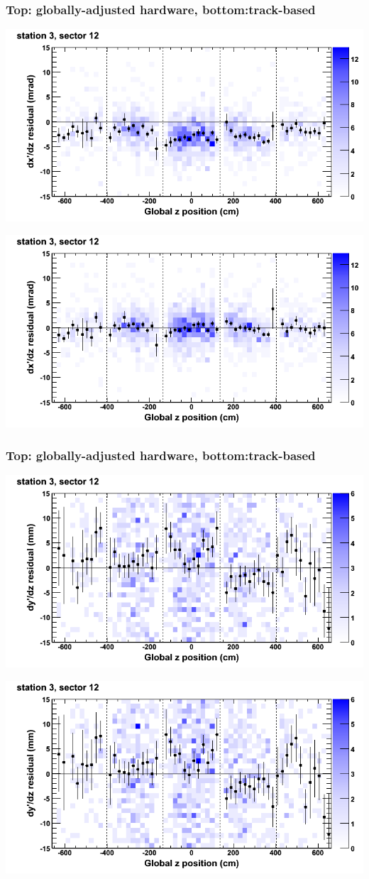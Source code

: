 \documentclass[compress]{beamer}
\begin{document}
\begin{frame}
\frametitle{Top: globally-adjusted hardware, bottom:track-based}
\includegraphics[width=0.7\linewidth]{NOV4_mapplots_HW/DTvsz_st3sec12_dxdz.png}

\includegraphics[width=0.7\linewidth]{NOV4_mapplots/DTvsz_st3sec12_dxdz.png}
\end{frame}

\begin{frame}
\frametitle{Top: globally-adjusted hardware, bottom:track-based}
\includegraphics[width=0.7\linewidth]{NOV4_mapplots_HW/DTvsz_st3sec12_dydz.png}

\includegraphics[width=0.7\linewidth]{NOV4_mapplots/DTvsz_st3sec12_dydz.png}
\end{frame}
\end{document}
